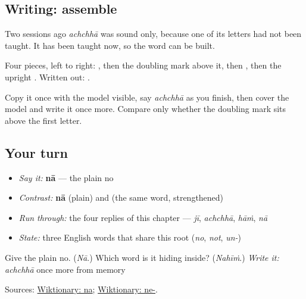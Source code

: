 \subsection*{Writing: assemble }
Two sessions ago \emph{achchhā} was sound only, because one of its letters had not been taught. It has been taught now, so the word can be built.

Four pieces, left to right: \textbf{}, then the doubling mark \textbf{} above it, then \textbf{}, then the upright \textbf{}. Written out: \textbf{}.

Copy it once with the model visible, say \emph{achchhā} as you finish, then cover the model and write it once more. Compare only whether the doubling mark sits above the first letter.

\subsection*{Your turn}
\begin{itemize}
\raggedright
  \item \emph{Say it:} \textbf{nā} — the plain no
  \item \emph{Contrast:} \textbf{nā} (plain) and \textbf{} (the same word, strengthened)
  \item \emph{Run through:} the four replies of this chapter — \emph{jī}, \emph{achchhā}, \emph{hāṁ}, \emph{nā}
  \item \emph{State:} three English words that share this root (\emph{no}, \emph{not}, \emph{un-})
\end{itemize}

\begin{tcolorbox}[breakable,colback=teal!4,colframe=teal!35!black,title={Before you move on}]
Give the plain no. (\emph{Nā}.) Which word is it hiding inside? (\emph{Nahīṁ}.) \emph{Write it:} \emph{achchhā} once more from memory

Sources: \href{https://en.wiktionary.org/wiki/\%E0\%A8\%A8\%E0\%A8\%BE}{Wiktionary: na}; \href{https://en.wiktionary.org/wiki/Reconstruction:Proto-Indo-European/ne}{Wiktionary: ne-}.
\end{tcolorbox}
